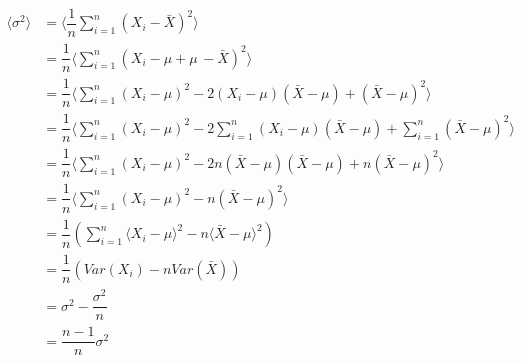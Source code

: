 \begin{align*}
    \langle \sigma^2 \rangle    &= \langle \dfrac{1}{n} \sum_{i=1}^n (X_i - \bar{X})^2 \rangle \\
                                &= \dfrac{1}{n} \langle  \sum_{i=1}^n (X_i - \mu + \mu \, - \bar{X})^2 \rangle \\ 
                                &= \dfrac{1}{n} \langle  \sum_{i=1}^n (X_i - \mu)^2 -2(X_i -\mu)(\bar{X} - \mu) + (\bar{X} - \mu)^2 \rangle \\
                                &= \dfrac{1}{n} \langle  \sum_{i=1}^n ( X_i - \mu)^2 -2 \sum_{i=1}^n (X_i -\mu)(\bar{X} - \mu) + \sum_{i=1}^n(\bar{X} - \mu)^2 \rangle  \\
                                &= \dfrac{1}{n} \langle  \sum_{i=1}^n ( X_i - \mu)^2 -2n(\bar{X} -\mu)(\bar{X} - \mu) + n(\bar{X} - \mu)^2 \rangle  \\
                                &= \dfrac{1}{n} \langle  \sum_{i=1}^n ( X_i - \mu)^2 -n(\bar{X} - \mu)^2 \rangle  \\
                                &= \dfrac{1}{n} \left( \sum_{i=1}^n \langle X_i - \mu \rangle^2 -n\langle\bar{X} -\mu \rangle^2 \right) \\
                                &= \dfrac{1}{n} \left( Var(X_i) -n Var(\bar{X})\right)  \\
                                &= \sigma^2 - \dfrac{\sigma^2}{n}   \\
                                &= \dfrac{n-1}{n} \sigma^2                               
\end{align*}

    